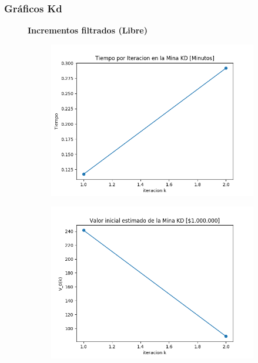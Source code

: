 \documentclass[12pt,letterpaper]{article}
\begin{document}
\subsubsection{Gráficos Kd}

\begin{figure}[H]
  \captionsetup[subfigure]{labelformat=empty}
  \centering
  
   \textbf{Incrementos filtrados (Libre)}
  
  \begin{subfigure}[b]{0.4\textwidth}
     \includegraphics[width=\textwidth]{Graficos/Incrementos_filtrados/libre/kd_inc_times.png}
     \caption{}
     \label{asda}
  \end{subfigure}
  \begin{subfigure}[b]{0.4\textwidth}
     \includegraphics[width=\textwidth]{Graficos/Incrementos_filtrados/libre/kd_inc_v_k.png}
     \caption{}
     \label{fig:ex2}
  \end{subfigure}
  

\end{figure}
\end{document}
